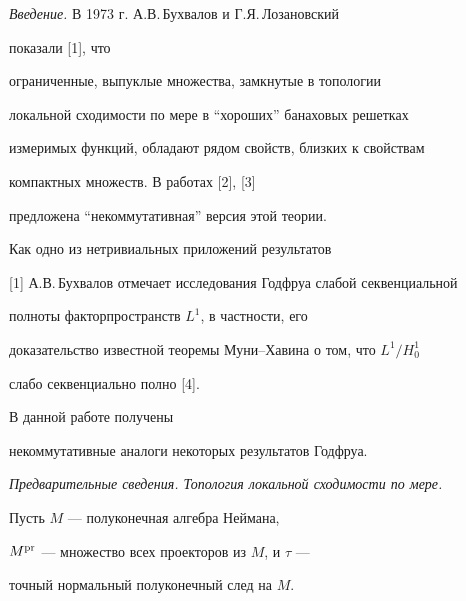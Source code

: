 

\pagestyle{plain} %







\maketitle


\label{begin}











{\it  Введение.} В 1973 г. А.В.\,Бухвалов и Г.Я.\,Лозановский


показали [1], что


ограниченные, выпуклые множества, замкнутые в топологии


локальной сходимости по мере в ``хороших'' банаховых решетках


измеримых функций, обладают рядом свойств, близких к свойствам


компактных множеств. В работах [2], [3]


предложена ``некоммутативная'' версия этой теории.


Как одно из нетривиальных приложений результатов


[1] А.В.\,Бухвалов отмечает исследования Годфруа слабой секвенциальной


полноты факторпространств $L^1$,  в частности, его


доказательство известной теоремы Муни--Хавина о том, что $L^1 / H^1_0$


слабо секвенциально полно [4].


В данной работе получены


некоммутативные аналоги некоторых результатов Годфруа.


\medskip





{\it Предварительные сведения. Топология локальной сходимости по мере.}


Пусть $M$ --- полуконечная алгебра Неймана,


$M^{\operatorname{pr}}$ --- множество всех проекторов из $M$, и $\tau$ ---


точный нормальный полуконечный след на $M$.


